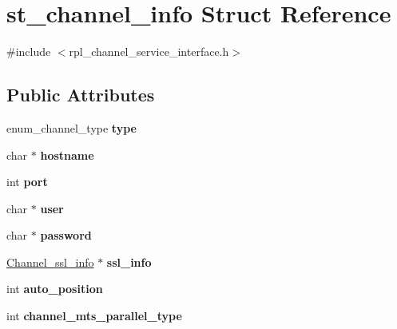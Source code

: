 \hypertarget{structst__channel__info}{}\section{st\+\_\+channel\+\_\+info Struct Reference}
\label{structst__channel__info}


{\ttfamily \#include $<$rpl\+\_\+channel\+\_\+service\+\_\+interface.\+h$>$}

\subsection*{Public Attributes}
\begin{DoxyCompactItemize}
\item 
\mbox{\label{structst__channel__info_acbbf8a712194824cf0d769433202a037}} 
enum\+\_\+channel\+\_\+type {\bfseries type}
\item 
\mbox{\label{structst__channel__info_aa2bdd0316b2a88f9aaa79f84a3044b11}} 
char $\ast$ {\bfseries hostname}
\item 
\mbox{\label{structst__channel__info_a35993bb0d5c55d3bf2f2507221643183}} 
int {\bfseries port}
\item 
\mbox{\label{structst__channel__info_a024cfe491dc537268d25dcd6ce231530}} 
char $\ast$ {\bfseries user}
\item 
\mbox{\label{structst__channel__info_a6a39d2ae1233a13569f9c612741a4f7f}} 
char $\ast$ {\bfseries password}
\item 
\mbox{\label{structst__channel__info_ada13683268635bbd042382ddff72543b}} 
\mbox{\hyperlink{structst__ssl__info}{Channel\+\_\+ssl\+\_\+info}} $\ast$ {\bfseries ssl\+\_\+info}
\item 
\mbox{\label{structst__channel__info_aa8c67b9ca07ec0a69dce18ae940e8bad}} 
int {\bfseries auto\+\_\+position}
\item 
\mbox{\label{structst__channel__info_af1d603480358ecf0b88dcb8ae9969d60}} 
int {\bfseries channel\+\_\+mts\+\_\+parallel\+\_\+type}

\end{DoxyCompactItemize}
